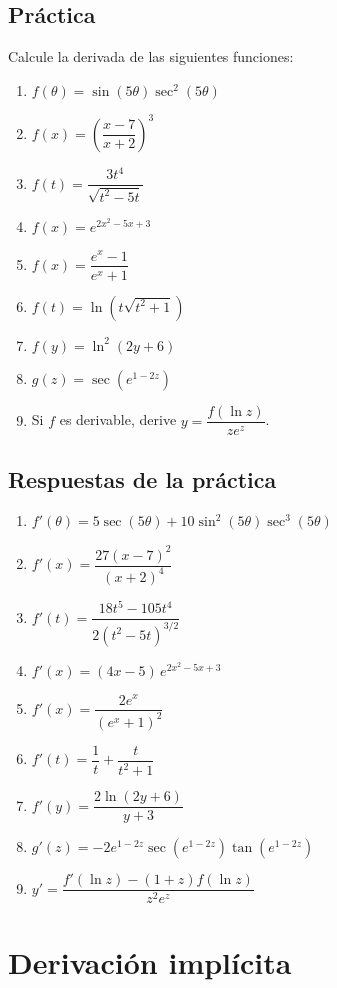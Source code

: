 \documentclass[12pt]{article}
\begin{document}
\subsection{Práctica}
Calcule la derivada de las siguientes funciones:
\begin{enumerate}
    \item $f(\theta) = \sin(5\theta)\sec^2(5\theta)$
    \item $f(x) = \left(\dfrac{x - 7}{x + 2}\right)^3$
    \item $f(t) = \dfrac{3t^4}{\sqrt{t^2 - 5t}}$
    \item $f(x) = e^{2x^2 - 5x + 3}$
    \item $f(x) = \dfrac{e^x - 1}{e^x + 1}$
    \item $f(t) = \ln\left(t\sqrt{t^2 + 1}\right)$
    \item $f(y) = \ln^2(2y + 6)$
    \item $g(z) = \sec\left(e^{1 - 2z}\right)$
    \item Si $f$ es derivable, derive $y = \dfrac{f(\ln z)}{z e^z}$.
\end{enumerate}

\subsection{Respuestas de la práctica}
\begin{enumerate}
    \item $f'(\theta) = 5\sec(5\theta) + 10\sin^2(5\theta)\sec^3(5\theta)$
    \item $f'(x) = \dfrac{27(x - 7)^2}{(x + 2)^4}$
    \item $f'(t) = \dfrac{18t^5 - 105t^4}{2(t^2 - 5t)^{3/2}}$
    \item $f'(x) = (4x - 5)\,e^{2x^2 - 5x + 3}$
    \item $f'(x) = \dfrac{2e^x}{(e^x + 1)^2}$
    \item $f'(t) = \dfrac{1}{t} + \dfrac{t}{t^2 + 1}$
    \item $f'(y) = \dfrac{2\ln(2y + 6)}{y + 3}$
    \item $g'(z) = -2e^{1 - 2z}\sec\left(e^{1 - 2z}\right)\tan\left(e^{1 - 2z}\right)$
    \item $y' = \dfrac{f'(\ln z) - (1 + z)f(\ln z)}{z^2 e^z}$
\end{enumerate}

\section{Derivación implícita}
\end{document}
